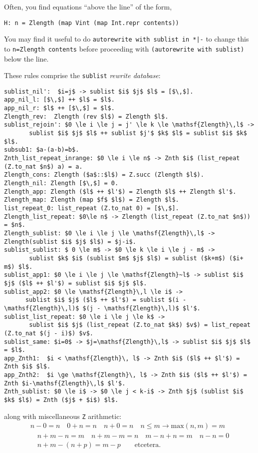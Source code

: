 \documentclass[12pt,fleqn,openany,oneside,showtrims]{memoir}
\begin{document}
Often, you find equations ``above the line'' of the form,
\begin{lstlisting}
H: n = Zlength (map Vint (map Int.repr contents))
\end{lstlisting}
\vspace{-\baselineskip}
You may find it useful to do \lstinline{autorewrite with sublist in *|-}
to change this to \lstinline{n=Zlength contents} before proceeding
with \lstinline{(autorewrite with sublist)} below the line.

These rules comprise the \lstinline{sublist} \emph{rewrite database}:

\begin{lstlisting}
sublist_nil':  $i=j$ -> sublist $i$ $j$ $l$ = [$\,$].
app_nil_l: [$\,$] ++ $l$ = $l$.
app_nil_r: $l$ ++ [$\,$] = $l$.
Zlength_rev:  Zlength (rev $l$) = Zlength $l$.
sublist_rejoin': $0 \le i \le j = j' \le k \le \mathsf{Zlength}\,l$ ->
       sublist $i$ $j$ $l$ ++ sublist $j'$ $k$ $l$ = sublist $i$ $k$ $l$.
subsub1: $a-(a-b)=b$.
Znth_list_repeat_inrange: $0 \le i \le n$ -> Znth $i$ (list_repeat (Z.to_nat $n$) a) = a.
Zlength_cons: Zlength ($a$::$l$) = Z.succ (Zlength $l$).
Zlength_nil: Zlength [$\,$] = 0.
Zlength_app: Zlength ($l$ ++ $l'$) = Zlength $l$ ++ Zlength $l'$.
Zlength_map: Zlength (map $f$ $l$) = Zlength $l$.
list_repeat_0: list_repeat (Z.to_nat 0) = [$\,$].
Zlength_list_repeat: $0\le n$ -> Zlength (list_repeat (Z.to_nat $n$)) = $n$.
Zlength_sublist: $0 \le i \le j \le \mathsf{Zlength}\,l$ -> Zlength(sublist $i$ $j$ $l$) = $j-i$.
sublist_sublist: $ 0 \le m$ -> $0 \le k \le i \le j - m$ ->
       sublist $k$ $i$ (sublist $m$ $j$ $l$) = sublist ($k+m$) ($i+ m$) $l$.
sublist_app1: $0 \le i \le j \le \mathsf{Zlength}~l$ -> sublist $i$ $j$ ($l$ ++ $l'$) = sublist $i$ $j$ $l$.
sublist_app2: $0 \le \mathsf{Zlength}\,l \le i$ ->
      sublist $i$ $j$ ($l$ ++ $l'$) = sublist $(i - \mathsf{Zlength}\,l)$ $(j - \mathsf{Zlength}\,l)$ $l'$.
sublist_list_repeat: $0 \le i \le j \le k$ ->
       sublist $i$ $j$ (list_repeat (Z.to_nat $k$) $v$) = list_repeat (Z.to_nat $(j - i)$) $v$.
sublist_same: $i=0$ -> $j=\mathsf{Zlength}\,l$ -> sublist $i$ $j$ $l$ = $l$.
app_Znth1:  $i < \mathsf{Zlength}\, l$ -> Znth $i$ ($l$ ++ $l'$) = Znth $i$ $l$.
app_Znth2:  $i \ge \mathsf{Zlength}\, l$ -> Znth $i$ ($l$ ++ $l'$) = Znth $i-\mathsf{Zlength}\,l$ $l'$.
Znth_sublist: $0 \le i$ -> $0 \le j < k-i$ -> Znth $j$ (sublist $i$ $k$ $l$) = Znth ($j$ + $i$) $l$.
\end{lstlisting}
\vspace{-\baselineskip}
along with miscellaneous \lstinline{Z} arithmetic:
\[
\begin{array}{c}
n-0=n \quad 0+n=n \quad n+0=n \quad n \le m \rightarrow \mathrm{max}(n,m) = m\\
\quad n + m - n = m
\quad n + m - m = n
\quad m - n + n = m
\quad n-n=0\\
\quad n + m - (n + p) = m - p \qquad \mathrm{et cetera.}
\end{array}
\]
\end{document}
